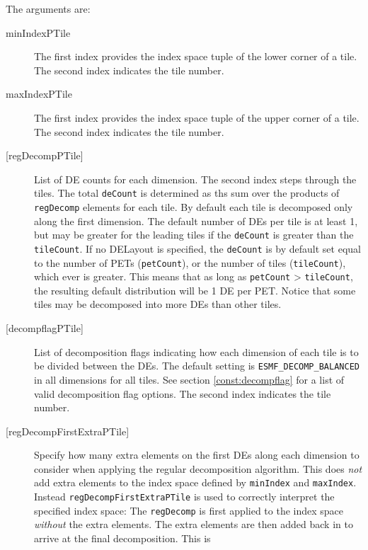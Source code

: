        The arguments are:
       \begin{description}
       \item[minIndexPTile]
            The first index provides the index space tuple of the lower 
            corner of a tile. The second index indicates the tile number.
       \item[maxIndexPTile]
            The first index provides the index space tuple of the upper
            corner of a tile. The second index indicates the tile number.
       \item[{[regDecompPTile]}]
            List of DE counts for each dimension. The second index steps through
            the tiles. The total {\tt deCount} is determined as ths sum over
            the products of {\tt regDecomp} elements for each tile.
            By default each tile is decomposed only along the first dimension.
            The default number of DEs per tile is at least 1, but may be greater
            for the leading tiles if the {\tt deCount} is greater than the 
            {\tt tileCount}. If no DELayout is specified, the {\tt deCount} is 
            by default set equal to the number of PETs ({\tt petCount}), or the 
            number of tiles ({\tt tileCount}), which ever is greater. This means
            that as long as {\tt petCount} > {\tt tileCount}, the resulting
            default distribution will be 1 DE per PET. Notice that some tiles
            may be decomposed into more DEs than other tiles.
       \item[{[decompflagPTile]}]
            List of decomposition flags indicating how each dimension of each
            tile is to be divided between the DEs. The default setting
            is {\tt ESMF\_DECOMP\_BALANCED} in all dimensions for all tiles. 
            See section \ref{const:decompflag} for a list of valid decomposition
            flag options. The second index indicates the tile number.
       \item[{[regDecompFirstExtraPTile]}]
            Specify how many extra elements on the first DEs along each 
            dimension to consider when applying the regular decomposition 
            algorithm. This does {\em not} add extra elements to the 
            index space defined by {\tt minIndex} and {\tt maxIndex}. Instead
            {\tt regDecompFirstExtraPTile} is used to correctly interpret the 
            specified index space: The {\tt regDecomp} is first applied to the
            index space {\em without} the extra elements. The extra elements are
            then added back in to arrive at the final decomposition. This is 

\end{description}
